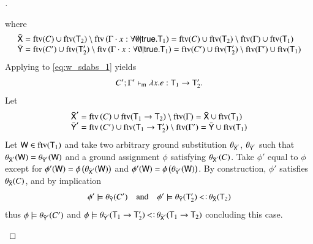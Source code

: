 \documentclass{report}
\begin{document}
\begin{proof}[]
\begin{indcase}{\decabs}
      where
      \begin{displaymath}
        \begin{array}{l}
          \bar{\textsf{X}} = \mathop{\rm ftv}\nolimits(C)\cup\mathop{\rm ftv}\nolimits(\textsf{T}_2)\setminus\mathop{\rm ftv}\nolimits\left({\Gamma\cdot x:\forall\emptyset|\textsf{true}.\textsf{T}_1}\right)
            =\mathop{\rm ftv}\nolimits(C)\cup\mathop{\rm ftv}\nolimits(\textsf{T}_2)\setminus\mathop{\rm ftv}\nolimits(\Gamma)\cup\mathop{\rm ftv}\nolimits(\textsf{T}_1)\\
          \bar{\textsf{Y}} = \mathop{\rm ftv}\nolimits(C')\cup\mathop{\rm ftv}\nolimits(\textsf{T}_2')\setminus\mathop{\rm ftv}\nolimits\left({\Gamma\cdot x:\forall\emptyset|\textsf{true}.\textsf{T}_1}\right)
            =\mathop{\rm ftv}\nolimits(C')\cup\mathop{\rm ftv}\nolimits(\textsf{T}_2')\setminus\mathop{\rm ftv}\nolimits(\Gamma')\cup\mathop{\rm ftv}\nolimits(\textsf{T}_1)
        \end{array}
      \end{displaymath}
      Applying \sdabs to \eqref{eq:w_sdabs_1} yields
      \begin{displaymath}
        C';\Gamma'\vdash_\textsf{m} \lambda x.e:\textsf{T}_1\rightarrow\textsf{T}_2'\textrm{.}
      \end{displaymath}
      Let
      \begin{displaymath}
        \begin{array}{l}
          \bar{\textsf{X}}' = \mathop{\rm ftv}\nolimits\left({C}\right)\cup\mathop{\rm ftv}\nolimits(\textsf{T}_1\rightarrow\textsf{T}_2)\setminus\mathop{\rm ftv}\nolimits(\Gamma)
            =\bar{\textsf{X}}\cup\mathop{\rm ftv}\nolimits(\textsf{T}_1)\\
          \bar{\textsf{Y}}' = \mathop{\rm ftv}\nolimits\left({C'}\right)\cup\mathop{\rm ftv}\nolimits(\textsf{T}_1\rightarrow\textsf{T}_2')\setminus\mathop{\rm ftv}\nolimits(\Gamma')
            =\bar{\textsf{Y}}\cup\mathop{\rm ftv}\nolimits(\textsf{T}_1)
        \end{array}
      \end{displaymath}
      Let $\textsf{W}\in\mathop{\rm ftv}\nolimits(\textsf{T}_1)$ and
      take two arbitrary ground substitution $\theta_{\bar{\textsf{X}}'}$,
      $\theta_{\bar{\textsf{Y}}'}$ such that
      $\theta_{\bar{\textsf{X}}'}(\textsf{W})=\theta_{\bar{\textsf{Y}}'}(\textsf{W})$ and a ground assignment $\phi$
      satisfying $\theta_{\bar{\textsf{X}}'}(C)$. Take $\phi'$ equal to $\phi$ except for
      $\phi'(\textsf{W})=\phi\left({\theta_{\bar{\textsf{X}}'}(\textsf{W})}\right)$ and
      $\phi'(\textsf{W})=\phi\left({\theta_{\bar{\textsf{Y}}'}(\textsf{W})}\right)$.
      By construction, $\phi'$ satisfies $\theta_{\bar{\textsf{X}}}(C)$, and by implication
      \begin{displaymath}
        \phi'\csat \theta_{\bar{\type{Y}}}(C') \quad\textrm{and}\quad
        \phi'\csat \theta_{\bar{\type{Y}}}(\type{T}_2')\subtype\theta_{\bar{\type{X}}}(\type{T}_2)
      \end{displaymath}
      thus $\phi\models\theta_{\bar{\textsf{Y}}'}(C')$ and
      $\phi\csat\theta_{\bar{\type{Y}}'}(\type{T}_1\fun\type{T}_2')\subtype\theta_{\bar{\type{X}}'}(\type{T}_1\fun\type{T}_2)$ concluding this case.

\end{indcase}
\end{proof}
\end{document}
